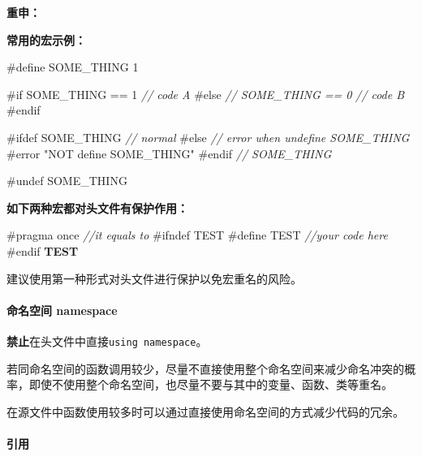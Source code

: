 \documentclass[
]{article}
\newenvironment{Shaded}{}{}
\newcommand{\CommentTok}[1]{\textcolor[rgb]{0.38,0.63,0.69}{\textit{#1}}}
\newcommand{\DecValTok}[1]{\textcolor[rgb]{0.25,0.63,0.44}{#1}}
\newcommand{\ErrorTok}[1]{\textcolor[rgb]{1.00,0.00,0.00}{\textbf{#1}}}
\newcommand{\PreprocessorTok}[1]{\textcolor[rgb]{0.74,0.48,0.00}{#1}}
\begin{document}
\textbf{重申：}

\textbf{常用的宏示例：}

\begin{Shaded}
\begin{Highlighting}[]
\PreprocessorTok{\#define SOME\_THING }\DecValTok{1}

\PreprocessorTok{\#if SOME\_THING == 1}
\CommentTok{// code A}
\PreprocessorTok{\#else }\CommentTok{// SOME\_THING == 0}
\CommentTok{// code B}
\PreprocessorTok{\#endif}

\PreprocessorTok{\#ifdef SOME\_THING}
\CommentTok{// normal}
\PreprocessorTok{\#else }\CommentTok{// error when undefine SOME\_THING}
\PreprocessorTok{\#error "NOT define SOME\_THING"}
\PreprocessorTok{\#endif }\CommentTok{// SOME\_THING}

\PreprocessorTok{\#undef SOME\_THING}
\end{Highlighting}
\end{Shaded}

\textbf{如下两种宏都对头文件有保护作用：}

\begin{Shaded}
\begin{Highlighting}[]
\PreprocessorTok{\#pragma once}
\CommentTok{//it equals to}
\PreprocessorTok{\#ifndef TEST}
\PreprocessorTok{\#define TEST}
\CommentTok{//your code here}
\PreprocessorTok{\#endif }\ErrorTok{TEST}
\end{Highlighting}
\end{Shaded}

建议使用第一种形式对头文件进行保护以免宏重名的风险。

\hypertarget{ux547dux540dux7a7aux95f4-namespace}{%
\paragraph{命名空间
namespace}\label{ux547dux540dux7a7aux95f4-namespace}}

\textbf{禁止}在头文件中直接\texttt{using\ namespace}。

若同命名空间的函数调用较少，尽量不直接使用整个命名空间来减少命名冲突的概率，即使不使用整个命名空间，也尽量不要与其中的变量、函数、类等重名。

在源文件中函数使用较多时可以通过直接使用命名空间的方式减少代码的冗余。

\hypertarget{ux5f15ux7528}{%
\paragraph{引用}\label{ux5f15ux7528}}
\end{document}
